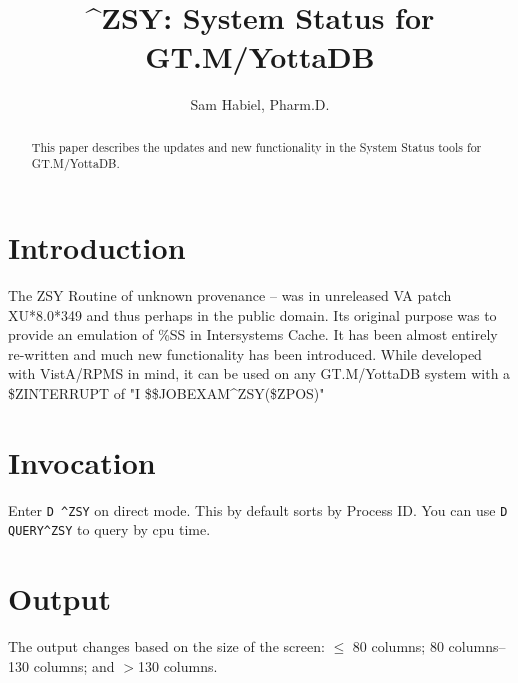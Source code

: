 \documentclass[]{article}
\title{\^{}ZSY: System Status for GT.M/YottaDB}
\author{Sam Habiel, Pharm.D.}
\begin{document}
\maketitle

\begin{abstract}
This paper describes the updates and new functionality in the System Status tools for GT.M/YottaDB.
\end{abstract}

\section{Introduction}
The ZSY Routine of unknown provenance -- was in unreleased VA patch XU*8.0*349 and thus perhaps in the public domain. Its original purpose was to provide an emulation of \%SS in Intersystems Cache. It has been almost entirely re-written and much new functionality has been introduced. While developed with VistA/RPMS in mind, it can be used on any GT.M/YottaDB system with a \$ZINTERRUPT of "I \$\$JOBEXAM\^{}ZSY(\$ZPOS)"

\section{Invocation}

Enter \texttt{D \^{}ZSY} on direct mode. This by default sorts by Process ID. You can use \texttt{D QUERY\^{}ZSY} to query by cpu time.

\section{Output}
The output changes based on the size of the screen: $\leq$ 80 columns; 80 columns--130 columns; and $>$130 columns.


\end{document}
